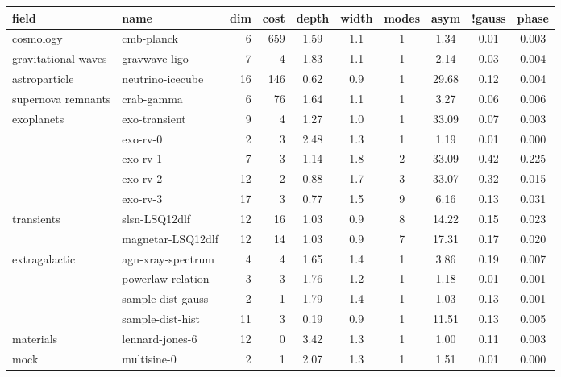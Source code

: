 
\begin{tabular}{ll|rrcccccc}
field                & name                 & dim & cost & depth & width & modes & asym & !gauss & phase \\
\hline
\hline
cosmology            & cmb-planck           & 6   & 659  & 1.59 & 1.1 &    1 & 1.34 & 0.01 & 0.003 \\
gravitational waves  & gravwave-ligo        & 7   & 4    & 1.83 & 1.1 &    1 & 2.14 & 0.03 & 0.004 \\
astroparticle        & neutrino-icecube     & 16  & 146  & 0.62 & 0.9 &    1 & 29.68 & 0.12 & 0.004 \\
supernova remnants   & crab-gamma           & 6   & 76   & 1.64 & 1.1 &    1 & 3.27 & 0.06 & 0.006 \\
exoplanets           & exo-transient        & 9   & 4    & 1.27 & 1.0 &    1 & 33.09 & 0.07 & 0.003 \\
                     & exo-rv-0             & 2   & 3    & 2.48 & 1.3 &    1 & 1.19 & 0.01 & 0.000 \\
                     & exo-rv-1             & 7   & 3    & 1.14 & 1.8 &    2 & 33.09 & 0.42 & 0.225 \\
                     & exo-rv-2             & 12  & 2    & 0.88 & 1.7 &    3 & 33.07 & 0.32 & 0.015 \\
                     & exo-rv-3             & 17  & 3    & 0.77 & 1.5 &    9 & 6.16 & 0.13 & 0.031 \\
transients           & slsn-LSQ12dlf        & 12  & 16   & 1.03 & 0.9 &    8 & 14.22 & 0.15 & 0.023 \\
                     & magnetar-LSQ12dlf    & 12  & 14   & 1.03 & 0.9 &    7 & 17.31 & 0.17 & 0.020 \\
extragalactic        & agn-xray-spectrum    & 4   & 4    & 1.65 & 1.4 &    1 & 3.86 & 0.19 & 0.007 \\
                     & powerlaw-relation    & 3   & 3    & 1.76 & 1.2 &    1 & 1.18 & 0.01 & 0.001 \\
                     & sample-dist-gauss    & 2   & 1    & 1.79 & 1.4 &    1 & 1.03 & 0.13 & 0.001 \\
                     & sample-dist-hist     & 11  & 3    & 0.19 & 0.9 &    1 & 11.51 & 0.13 & 0.005 \\
materials            & lennard-jones-6      & 12  & 0    & 3.42 & 1.3 &    1 & 1.00 & 0.11 & 0.003 \\
\hline
mock                 & multisine-0          & 2   & 1    & 2.07 & 1.3 &    1 & 1.51 & 0.01 & 0.000 \\

\end{tabular}
